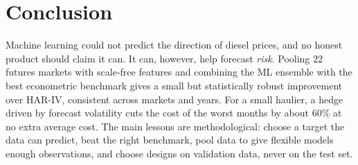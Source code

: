 \section{Conclusion}

Machine learning could not predict the direction of diesel prices, and no honest product should claim it
can. It can, however, help forecast \emph{risk}. Pooling 22 futures markets with scale-free features and
combining the ML ensemble with the best econometric benchmark gives a small but statistically robust
improvement over HAR-IV, consistent across markets and years. For a small haulier, a hedge driven by forecast
volatility cuts the cost of the worst months by about 60\% at no extra average cost. The main lessons are
methodological: choose a target the data can predict, beat the right benchmark, pool data to give flexible
models enough observations, and choose designs on validation data, never on the test set.
